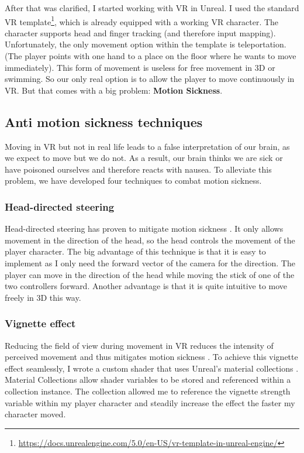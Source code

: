 \documentclass[letterpaper, 10 pt, conference]{ieeeconf}  %
\begin{document}
After that was clarified, I started working with VR in Unreal.
I used the standard VR template\footnote{\url{https://docs.unrealengine.com/5.0/en-US/vr-template-in-unreal-engine/}}, which is already equipped with a working VR character.
The character supports head and finger tracking (and therefore input mapping).
Unfortunately, the only movement option within the template is teleportation.
(The player points with one hand to a place on the floor where he wants to move immediately).
This form of movement is useless for free movement in 3D or swimming.
So our only real option is to allow the player to move continuously in VR.
But that comes with a big problem: \textbf{Motion Sickness}.

\subsection{Anti motion sickness techniques}

Moving in VR but not in real life leads to a false interpretation of our brain, as we expect to move but we do not.
As a result, our brain thinks we are sick or have poisoned ourselves and therefore reacts with nausea.
To alleviate this problem, we have developed four techniques to combat motion sickness.

\subsubsection{Head-directed steering}

Head-directed steering has proven to mitigate motion sickness \cite{jerald2017vr}.
It only allows movement in the direction of the head, so the head controls the movement of the player character.
The big advantage of this technique is that it is easy to implement as I only need the forward vector of the camera for the direction.
The player can move in the direction of the head while moving the stick of one of the two controllers forward.
Another advantage is that it is quite intuitive to move freely in 3D this way.

\subsubsection{Vignette effect}

Reducing the field of view during movement in VR reduces the intensity of perceived movement and thus mitigates motion sickness \cite{basting2017effectiveness}.
To achieve this vignette effect seamlessly, I wrote a custom shader that uses Unreal's material collections \cite{collections}.
Material Collections allow shader variables to be stored and referenced within a collection instance. 
The collection allowed me to reference the vignette strength variable within my player character and steadily increase the effect the faster my character moved.
\end{document}
